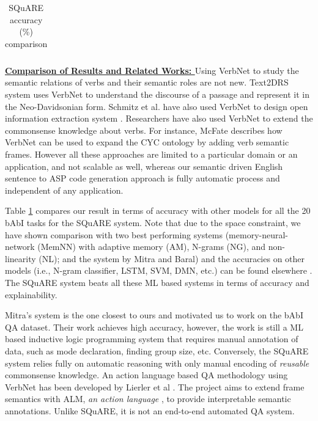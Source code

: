 \documentclass[letterpaper]{article}
\begin{document}
\begin{table}[b]
\begin{tabular}{|c||*{3}{c|}}
\end{tabular}

\vspace{-0.73mm}
\vspace{-1.47mm}
\caption{SQuARE accuracy (\%)  comparison}
\label{table:square_compare}
\end{table}



\noindent\textbf{\underline{Comparison of Results and Related Works: }}
Using VerbNet to study the semantic relations of verbs and their semantic roles are not new. Text2DRS system \cite{text_to_drs} uses VerbNet to understand the discourse of a passage and represent it in the Neo-Davidsonian form. Schmitz et al. have also used VerbNet to design open information extraction system \cite{vn_ie}. Researchers have also used VerbNet to extend the commonsense knowledge about verbs. For instance, McFate \cite{cyc_vn} describes how VerbNet can be used to expand the CYC ontology by adding verb semantic frames. However all these approaches are limited to a particular domain or an application, and not scalable as well, whereas our semantic driven English sentence to ASP code generation approach is fully automatic process and independent of any application.

Table \ref{table:square_compare} compares our result in terms of accuracy with other models for all the 20 bAbI tasks for the SQuARE system. Note that due to the space constraint, we have shown comparison with two best performing systems (memory-neural-network (MemNN) with adaptive memory (AM), N-grams (NG), and non-linearity (NL); and the system by Mitra and Baral) and the accuracies on other models (i.e., N-gram classifier, LSTM, SVM, DMN, etc.) can be found elsewhere \cite{babi,dmn}. The SQuARE system beats all these ML based systems in terms of accuracy and explainability.

Mitra's system is the one closest to ours and motivated us to work on
the bAbI QA dataset. Their work achieves high accuracy, however, the
work is still a ML based inductive logic programming system that
requires manual annotation of data, such as mode declaration, finding
group size, etc. Conversely, the SQuARE system relies fully on
automatic reasoning with only manual encoding of \textit{reusable}
commonsense knowledge. An action language based QA methodology using
VerbNet has been developed by Lierler et al \cite{ALM}. The project
aims to extend frame semantics with ALM, \textit{an action language}
\cite{ALM}, to provide interpretable semantic annotations. Unlike
SQuARE, it is not an end-to-end automated QA system.
\end{document}
